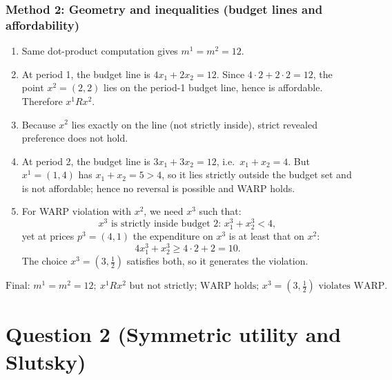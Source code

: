 \documentclass[12pt]{article}
\begin{document}
\subsubsection*{Method 2: Geometry and inequalities (budget lines and affordability)}
\begin{enumerate}[label=(\alph*), leftmargin=*]
\item Same dot-product computation gives \(m^1=m^2=12\).

\item At period 1, the budget line is \(4x_1+2x_2=12\).
Since \(4\cdot 2+2\cdot 2=12\), the point \(x^2=(2,2)\) lies on the period-1 budget line, hence is affordable. Therefore \(x^1 R x^2\).

\item Because \(x^2\) lies exactly on the line (not strictly inside), strict revealed preference does not hold.

\item At period 2, the budget line is \(3x_1+3x_2=12\), i.e.\ \(x_1+x_2=4\).
But \(x^1=(1,4)\) has \(x_1+x_2=5>4\), so it lies strictly outside the budget set and is not affordable; hence no reversal is possible and WARP holds.

\item For WARP violation with \(x^2\), we need \(x^3\) such that:
\[
x^3\text{ is strictly inside budget 2: }x_1^3+x_2^3<4,
\]
yet at prices \(p^3=(4,1)\) the expenditure on \(x^3\) is at least that on \(x^2\):
\[
4x_1^3+x_2^3 \ge 4\cdot 2+2=10.
\]
The choice \(x^3=(3,\tfrac12)\) satisfies both, so it generates the violation.
\end{enumerate}

\[
\boxed{\text{Final: }m^1=m^2=12;\ x^1 R x^2\text{ but not strictly; WARP holds; }x^3=(3,\tfrac12)\text{ violates WARP.}}
\]

\newpage
\section*{Question 2 (Symmetric utility and Slutsky)}
\end{document}
